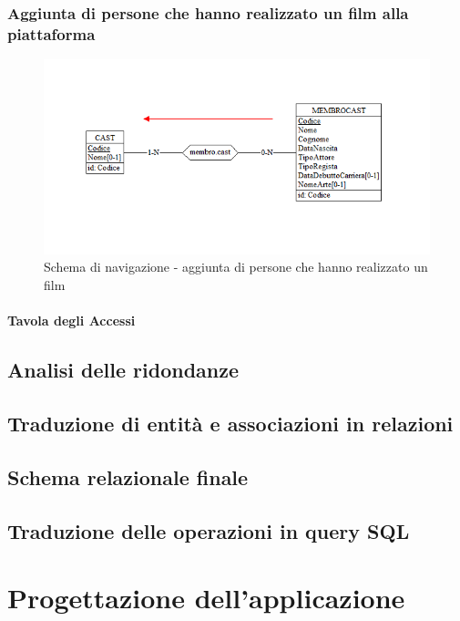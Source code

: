 \documentclass[a4paper,12pt]{report}
\begin{document}
	\subsection{Aggiunta di persone che hanno realizzato un film alla piattaforma}
	\begin{figure}[H]
		\centering
		\includegraphics[width=450pt]{ER/navigazione/aggiuntacast.png}
		\caption{Schema di navigazione - aggiunta di persone che hanno realizzato un film}
	\end{figure}
	
	\subsubsection{Tavola degli Accessi}
	\section{Analisi delle ridondanze}
	\section{Traduzione di entità e associazioni in relazioni}
	\section{Schema relazionale finale}
	\section{Traduzione delle operazioni in query SQL}
	\chapter{Progettazione dell'applicazione}
\end{document}
